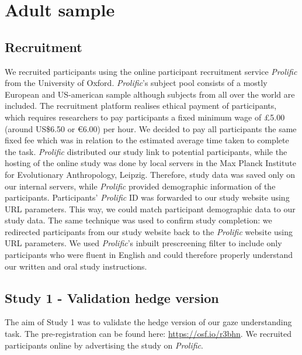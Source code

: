 \documentclass[
  man,floatsintext]{apa6}
\begin{document}
\hypertarget{adult-sample}{%
\section{Adult sample}\label{adult-sample}}

\hypertarget{recruitment}{%
\subsection{Recruitment}\label{recruitment}}

We recruited participants using the online participant recruitment service \emph{Prolific} from the University of Oxford.
\emph{Prolific}'s subject pool consists of a mostly European and US-american sample although subjects from all over the world are included.
The recruitment platform realises ethical payment of participants, which requires researchers to pay participants a fixed minimum wage of £5.00 (around US\$6.50 or €6.00) per hour.
We decided to pay all participants the same fixed fee which was in relation to the estimated average time taken to complete the task.
\emph{Prolific} distributed our study link to potential participants, while the hosting of the online study was done by local servers in the Max Planck Institute for Evolutionary Anthropology, Leipzig.
Therefore, study data was saved only on our internal servers, while \emph{Prolific} provided demographic information of the participants.
Participants' \emph{Prolific} ID was forwarded to our study website using URL parameters.
This way, we could match participant demographic data to our study data.
The same technique was used to confirm study completion: we redirected participants from our study website back to the \emph{Prolific} website using URL parameters.
We used \emph{Prolific}'s inbuilt prescreening filter to include only participants who were fluent in English and could therefore properly understand our written and oral study instructions.

\hypertarget{study-1---validation-hedge-version}{%
\subsection{Study 1 - Validation hedge version}\label{study-1---validation-hedge-version}}

The aim of Study 1 was to validate the hedge version of our gaze understanding task.
The pre-registration can be found here: \url{https://osf.io/r3bhn}.
We recruited participants online by advertising the study on \emph{Prolific}.
\end{document}
